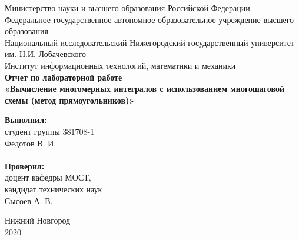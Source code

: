 \documentclass{article}
\begin{document}
\begin{titlepage}

\begin{center}
Министерство науки и высшего образования Российской Федерации \\
\vspace{5mm}
Федеральное государственное автономное образовательное учреждение высшего образования \\
Национальный исследовательский Нижегородский государственный университет им. Н.И. Лобачевского \\
\vspace{1cm}
Институт информационных технологий, математики и механики \\
\vspace{5cm}
\textbf{\large Отчет по лабораторной работе} \\
\vspace{8mm}
\textbf{\Large «Вычисление многомерных интегралов с использованием многошаговой схемы (метод прямоугольников)»} \\
\end{center}

\vspace{3cm}

\newbox{\lbox}
\newlength{\maxl}
\setlength{\maxl}{\wd\lbox}
\hfill\parbox{7cm}{
\hspace*{5cm}\hspace*{-5cm}\textbf{Выполнил:} \\ студент группы 381708-1 \\ Федотов В. И.\\
\\
\hspace*{5cm}\hspace*{-5cm}\textbf{Проверил:}\\ доцент кафедры МОСТ, \\ кандидат технических наук \\ Сысоев А. В.
}

\vspace{\fill}

\begin{center} 
Нижний Новгород \\ 2020
\end{center}
\end{titlepage}

\setcounter{page}{2}

\tableofcontents

\newpage
\end{document}
